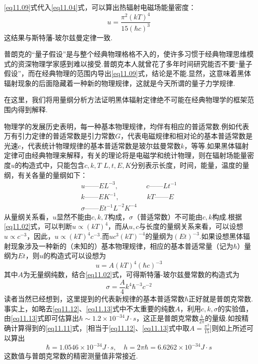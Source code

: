 \eqref{eq11.09}式代入\eqref{eq11.04}式，可以算出热辐射电磁场能量密度：
\begin{equation}\label{eq11.11}
	u=\frac{\pi^{2}(kT)^{4}}{15(\hbar c)^{3}}
\end{equation}\eqnormal
这结果与斯特藩-玻尔兹曼定律一致.

普朗克的“量子假设”是与整个经典物理格格不入的，使许多习惯于经典物理思维模式的资深物理学家感到难以接受.普朗克本人就曾花了多年时间研究能否不要“量子假设”，而在经典物理的范围内导出\eqref{eq11.09}式，结论是不能.显然，这意味着黑体辐射现象的后面隐藏着一种新的物理规律，这就是今天所谓的量子力学规律.

在这里，我们将用量纲分析方法证明黑体辐射定律绝不可能在经典物理学的框架范围内得到解释.

物理学的发展历史表明，每一种基本物理规律，均伴有相应的普适常数.例如代表万有引力定律的普适常数是引力常数$G$，代表电磁规律和相对论的基本普适常数是光速$c$，代表统计物理规律的基本普适常数是玻尔兹曼常数$k$，等等.如果黑体辐射定律可由经典物理来解释，有关的理论将是电磁学和统计物理，则在辐射场能量密度$u$的构造式中，只能包含$c,k,T$ $L,t,E,K$分别表示长度，时间，能量，温度的量纲，有关各量的量纲如下：
\begin{gather*}
	u——  \si{EL^{-3}},\qquad \qquad c——  \si{Lt^{-1}}  \\
	k——  \si{EK^{-1}},\qquad \qquad kT—— \si{E}  \\
	\sigma——  \si{Et^{-1}L^{-2}K^{-4}}
\end{gather*}
从量纲关系看，$u$显然不能由$c,k,T$构成，$\sigma$（普适常数）不可能由$c,k$构成.根据\eqref{eq11.02}式，可以判断$u\propto(kT)^{4}$，而从$u,c$与长度的量纲关系来看，可以设想$u\propto c^{-3}$，因此，$u\propto(kT)^{4}c^{-3}$.而$uc^{3}(kT)^{-4}$的量纲为$\si{(Et)^{-3}}$.如果设想黑体辐射现象涉及一种新的（未知的）基本物理规律，相应的基本普适常量（记为$\hbar$）量纲为$\si{Et}$，则$u$的构造式可以设想为
\eqshort
\begin{equation}\label{eq11.12}
	u=A(kT)^{4}(\hbar c)^{-3}
\end{equation}
其中$A$为无量纲纯数，结合\eqref{eq11.02}式，可得斯特藩-玻尔兹曼常数的构造式为
\begin{equation}\label{eq11.13}
	\sigma=\frac{A}{4}k^{4}\hbar^{-3}c^{-2}
\end{equation}\eqnormal
读者当然已经想到，这里提到的代表新规律的基本普适常数$\hbar$正好就是普朗克常数.事实上，如略去\eqref{eq11.12}、\eqref{eq11.13}式中不太重要的纯数$A$，利用$c,k,\sigma$的实验值，由\eqref{eq11.13}式即可估算出$\hbar \sim1.2\times 10^{-34} \si{J\cdot s}$，这正是普朗克常数$\frac{h}{2\pi}$的量级.如按精确计算得到的\eqref{eq11.11}式，[相当于\eqref{eq11.12}、\eqref{eq11.13}式中取$A=\frac{\pi^{2}}{15}$]则如上所述可以算出
\setlength{\mathindent}{4em}
\begin{equation*}
	\hbar=1.0546\times 10^{-34} \si{J\cdot s},\quad h=2\pi\hbar=6.6262\times 10^{-34} \si{J\cdot s}
\end{equation*}
\setlength{\mathindent}{9em}
这数值与普朗克常数的精密测量值非常接近.

